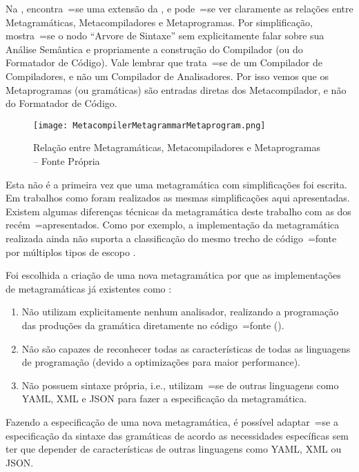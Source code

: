 Na ,
encontra~=se uma extensão da ,
e pode~=se ver claramente as relações entre Metagramáticas,
Metacompiladores e Metaprogramas. Por simplificação,
mostra~=se o nodo ``Arvore de Sintaxe'' sem explicitamente falar sobre sua Análise Semântica e
propriamente a construção do Compilador (ou do Formatador de Código).
Vale lembrar que trata~=se de um Compilador de Compiladores,
e não um Compilador de Analisadores.
Por isso vemos que os Metaprogramas (ou gramáticas) são entradas diretas dos Metacompilador,
e não do Formatador de Código.
\begin{figure}[h]
\centering
\texttt{[image: MetacompilerMetagrammarMetaprogram.png]}
\caption[Relação entre Metagramáticas, Metacompiladores e Metaprogramas]{Relação entre Metagramáticas, Metacompiladores e Metaprogramas -- Fonte Própria \cite{larkErrorRecovery}}
\label{MetacompilerMetagrammarMetaprogram}
\end{figure}

Esta não é a primeira vez que uma metagramática com simplificações foi escrita.
Em trabalhos como  foram realizados as mesmas simplificações aqui apresentadas.
Existem algumas diferenças técnicas da metagramática deste trabalho com as dos recém~=apresentados.
Como por exemplo,
a implementação da metagramática realizada ainda não suporta a classificação do mesmo trecho de código~=fonte por múltiplos tipos de escopo \cite{vsCodeSyntaxHighlighthing}.

Foi escolhida a criação de uma nova metagramática por que as implementações de metagramáticas já existentes como :
\begin{enumerate}[1)]
\item Não utilizam explicitamente nenhum analisador,
realizando a programação das produções da gramática diretamente no código~=fonte ().
\item Não são capazes de reconhecer todas as características de todas as linguagens de programação (devido a optimizações para maior performance).
\item Não possuem sintaxe própria,
i.e.,
utilizam~=se de outras linguagens como YAML,
XML e
JSON para fazer a especificação da metagramática.
\end{enumerate}
Fazendo a especificação de uma nova metagramática,
é possível adaptar~=se a especificação da sintaxe das gramáticas de acordo as necessidades específicas sem ter que depender de características de outras linguagens como YAML,
XML ou
JSON.


